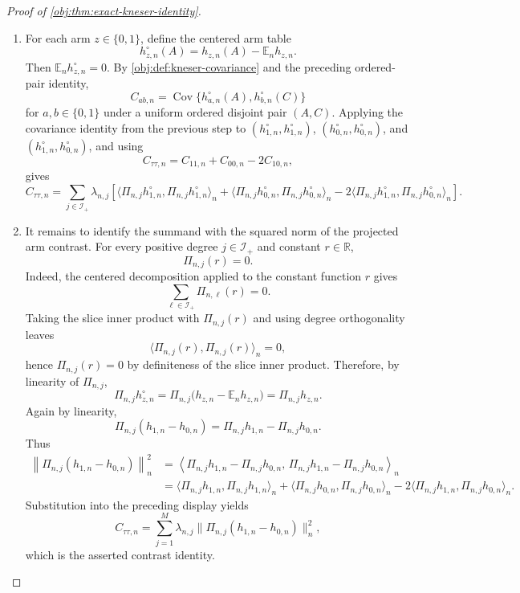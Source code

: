 \begin{proof}[Proof of \cref{obj:thm:exact-kneser-identity}]
\begin{enumerate}
\item For each arm \(z\in\{0,1\}\), define the centered arm table
\[
h_{z,n}^{\circ}(A)=h_{z,n}(A)-\mathbb E_n h_{z,n}.
\]
Then \(\mathbb E_n h_{z,n}^{\circ}=0\).  By \cref{obj:def:kneser-covariance} and the preceding ordered-pair identity,
\[
C_{ab,n}
=
\operatorname{Cov}\{h_{a,n}^{\circ}(A),h_{b,n}^{\circ}(C)\}
\]
for \(a,b\in\{0,1\}\) under a uniform ordered disjoint pair \((A,C)\).  Applying the covariance identity from the previous step to \((h_{1,n}^{\circ},h_{1,n}^{\circ})\), \((h_{0,n}^{\circ},h_{0,n}^{\circ})\), and \((h_{1,n}^{\circ},h_{0,n}^{\circ})\), and using
\[
C_{\tau\tau,n}=C_{11,n}+C_{00,n}-2C_{10,n},
\]
gives
\[
C_{\tau\tau,n}
=
\sum_{j\in\mathcal I_+}\lambda_{n,j}
\left[
\langle \Pi_{n,j}h_{1,n}^{\circ},\Pi_{n,j}h_{1,n}^{\circ}\rangle_n
+
\langle \Pi_{n,j}h_{0,n}^{\circ},\Pi_{n,j}h_{0,n}^{\circ}\rangle_n
-
2\langle \Pi_{n,j}h_{1,n}^{\circ},\Pi_{n,j}h_{0,n}^{\circ}\rangle_n
\right].
\]

\item It remains to identify the summand with the squared norm of the projected arm contrast.  For every positive degree \(j\in\mathcal I_+\) and constant \(r\in\mathbb R\),
\[
\Pi_{n,j}(r)=0.
\]
Indeed, the centered decomposition applied to the constant function \(r\) gives
\[
\sum_{\ell\in\mathcal I_+}\Pi_{n,\ell}(r)=0.
\]
Taking the slice inner product with \(\Pi_{n,j}(r)\) and using degree orthogonality leaves
\[
\langle \Pi_{n,j}(r),\Pi_{n,j}(r)\rangle_n=0,
\]
hence \(\Pi_{n,j}(r)=0\) by definiteness of the slice inner product.  Therefore, by linearity of \(\Pi_{n,j}\),
\[
\Pi_{n,j}h_{z,n}^{\circ}
=
\Pi_{n,j}\bigl(h_{z,n}-\mathbb E_n h_{z,n}\bigr)
=
\Pi_{n,j}h_{z,n}.
\]
Again by linearity,
\[
\Pi_{n,j}(h_{1,n}-h_{0,n})
=
\Pi_{n,j}h_{1,n}-\Pi_{n,j}h_{0,n}.
\]
Thus
\[
\begin{aligned}
\left\|\Pi_{n,j}(h_{1,n}-h_{0,n})\right\|_n^2
&=
\left\langle
\Pi_{n,j}h_{1,n}-\Pi_{n,j}h_{0,n},\,
\Pi_{n,j}h_{1,n}-\Pi_{n,j}h_{0,n}
\right\rangle_n  \\
&=
\langle \Pi_{n,j}h_{1,n},\Pi_{n,j}h_{1,n}\rangle_n
+
\langle \Pi_{n,j}h_{0,n},\Pi_{n,j}h_{0,n}\rangle_n
-
2\langle \Pi_{n,j}h_{1,n},\Pi_{n,j}h_{0,n}\rangle_n .
\end{aligned}
\]
Substitution into the preceding display yields
\[
C_{\tau\tau,n}
=
\sum_{j=1}^{M}\lambda_{n,j}
\bigl\|\Pi_{n,j}(h_{1,n}-h_{0,n})\bigr\|_n^2,
\]
which is the asserted contrast identity.
\end{enumerate}
\end{proof}

